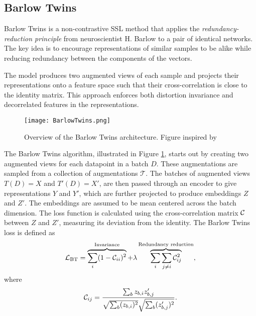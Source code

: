 \documentclass[../../thesis.tex]{subfiles}
\begin{document}

\subsection{Barlow Twins}

Barlow Twins is a non-contrastive SSL method that applies the \textit{redundancy-reduction principle} \cite{Barlow_origin} from neuroscientist H. Barlow to a pair of identical networks. The key idea is to encourage representations of similar samples to be alike while reducing redundancy between the components of the vectors.\newline

The model produces two augmented views of each sample and projects their representations onto a feature space such that their cross-correlation is close to the identity matrix. This approach enforces both distortion invariance and decorrelated features in the representations.\newline

\begin{figure}[h]
    \texttt{[image: BarlowTwins.png]}
    \centering    
    \caption{Overview of the Barlow Twins architecture. Figure inspired by \cite{zbontar2021barlow}}
    \label{fig:BarlowTwins}
\end{figure}

The Barlow Twins algorithm, illustrated in Figure \ref{fig:BarlowTwins}, starts out by creating two augmented views for each datapoint in a batch $D$. These augmentations are sampled from a collection of augmentations $\mathcal{T}$. The batches of augmented views $T(D) = X$ and $T'(D) =X'$, are then passed through an encoder to give representations $Y$ and $Y'$, which are further projected to produce embeddings $Z$ and $Z'$. The embeddings are assumed to be mean centered across the batch dimension. The loss function is calculated using the cross-correlation matrix $\mathcal{C}$ between $Z$ and $Z'$, measuring its deviation from the identity. The Barlow Twins loss is defined as
\begin{equation}
    \label{eq:BTLoss}
    \mathcal{L}_{\text{BT}} = 
    \overbrace{\sum_i (1 - \mathcal{C}_{ii})^2}^{\text{Invariance}}
    +\lambda  \overbrace{\sum_i\sum_{j\neq i} \mathcal{C}_{ij}^2}^{\text{Redundancy reduction}},
\end{equation}
where
\begin{equation}
    \mathcal{C}_{ij} = \frac{\sum_b z_{b,i}z_{b,j}'}{\sqrt{\sum_b (z_{b,i})^2}\sqrt{\sum_b (z_{b,j}')^2}}.
\end{equation}
\end{document}

